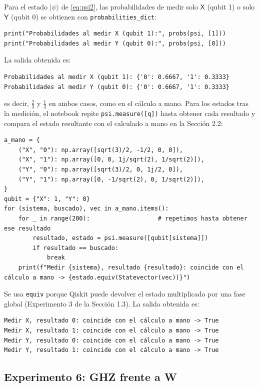 \documentclass[11pt, a4paper, twoside, openright]{report}
\begin{document}
\noindent Para el estado $|\psi\rangle$ de \eqref{eq:psi2}, las probabilidades de medir solo $\mathsf{X}$ (qubit 1) o solo $\mathsf{Y}$ (qubit 0) se obtienen con \texttt{probabilities\_dict}:
\begin{lstlisting}
print("Probabilidades al medir X (qubit 1):", probs(psi, [1]))
print("Probabilidades al medir Y (qubit 0):", probs(psi, [0]))
\end{lstlisting}
\noindent La salida obtenida es:
\begin{lstlisting}[language={}]
Probabilidades al medir X (qubit 1): {'0': 0.6667, '1': 0.3333}
Probabilidades al medir Y (qubit 0): {'0': 0.6667, '1': 0.3333}
\end{lstlisting}
\noindent es decir, $\frac23$ y $\frac13$ en ambos casos, como en el cálculo a mano. Para los estados tras la medición, el notebook repite \texttt{psi.measure([q])} hasta obtener cada resultado y compara el estado resultante con el calculado a mano en la Sección 2.2:
\begin{lstlisting}
a_mano = {
    ("X", "0"): np.array([sqrt(3)/2, -1/2, 0, 0]),
    ("X", "1"): np.array([0, 0, 1j/sqrt(2), 1/sqrt(2)]),
    ("Y", "0"): np.array([sqrt(3)/2, 0, 1j/2, 0]),
    ("Y", "1"): np.array([0, -1/sqrt(2), 0, 1/sqrt(2)]),
}
qubit = {"X": 1, "Y": 0}
for (sistema, buscado), vec in a_mano.items():
    for _ in range(200):                   # repetimos hasta obtener ese resultado
        resultado, estado = psi.measure([qubit[sistema]])
        if resultado == buscado:
            break
    print(f"Medir {sistema}, resultado {resultado}: coincide con el cálculo a mano -> {estado.equiv(Statevector(vec))}")
\end{lstlisting}
\noindent Se usa \texttt{equiv} porque Qiskit puede devolver el estado multiplicado por una fase global (Experimento 3 de la Sección 1.3). La salida obtenida es:
\begin{lstlisting}[language={}]
Medir X, resultado 0: coincide con el cálculo a mano -> True
Medir X, resultado 1: coincide con el cálculo a mano -> True
Medir Y, resultado 0: coincide con el cálculo a mano -> True
Medir Y, resultado 1: coincide con el cálculo a mano -> True
\end{lstlisting}

\subsection{Experimento 6: GHZ frente a W}
\end{document}
